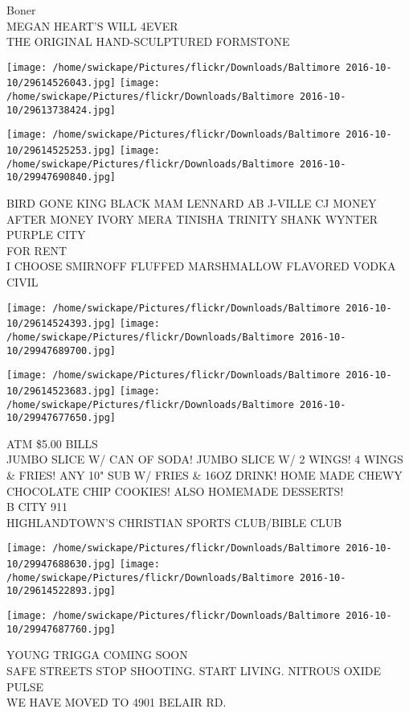 \documentclass[10pt,letterpaper]{article}
\begin{document}
Boner\\
MEGAN HEART'S WILL 4EVER\\
THE ORIGINAL HAND{-}SCULPTURED FORMSTONE
\pagebreak

\texttt{[image: /home/swickape/Pictures/flickr/Downloads/Baltimore 2016-10-10/29614526043.jpg]}
\texttt{[image: /home/swickape/Pictures/flickr/Downloads/Baltimore 2016-10-10/29613738424.jpg]}

\texttt{[image: /home/swickape/Pictures/flickr/Downloads/Baltimore 2016-10-10/29614525253.jpg]}
\texttt{[image: /home/swickape/Pictures/flickr/Downloads/Baltimore 2016-10-10/29947690840.jpg]}

BIRD GONE KING BLACK MAM LENNARD AB J{-}VILLE CJ MONEY AFTER MONEY IVORY MERA TINISHA TRINITY SHANK WYNTER PURPLE CITY\\
FOR RENT\\
I CHOOSE SMIRNOFF FLUFFED MARSHMALLOW FLAVORED VODKA\\
CIVIL
\pagebreak

\texttt{[image: /home/swickape/Pictures/flickr/Downloads/Baltimore 2016-10-10/29614524393.jpg]}
\texttt{[image: /home/swickape/Pictures/flickr/Downloads/Baltimore 2016-10-10/29947689700.jpg]}

\texttt{[image: /home/swickape/Pictures/flickr/Downloads/Baltimore 2016-10-10/29614523683.jpg]}
\texttt{[image: /home/swickape/Pictures/flickr/Downloads/Baltimore 2016-10-10/29947677650.jpg]}

ATM \$5.00 BILLS\\
JUMBO SLICE W/ CAN OF SODA! JUMBO SLICE W/ 2 WINGS!    4 WINGS \& FRIES!  ANY 10" SUB W/ FRIES \& 16OZ DRINK!  HOME MADE CHEWY CHOCOLATE CHIP COOKIES!  ALSO HOMEMADE DESSERTS!\\
B CITY 911\\
HIGHLANDTOWN'S CHRISTIAN SPORTS CLUB/BIBLE CLUB
\pagebreak

\texttt{[image: /home/swickape/Pictures/flickr/Downloads/Baltimore 2016-10-10/29947688630.jpg]}
\texttt{[image: /home/swickape/Pictures/flickr/Downloads/Baltimore 2016-10-10/29614522893.jpg]}

\texttt{[image: /home/swickape/Pictures/flickr/Downloads/Baltimore 2016-10-10/29947687760.jpg]}

YOUNG TRIGGA COMING SOON\\
SAFE STREETS STOP SHOOTING. START LIVING.  NITROUS OXIDE PULSE\\
WE HAVE MOVED TO 4901 BELAIR RD.
\pagebreak
\end{document}
